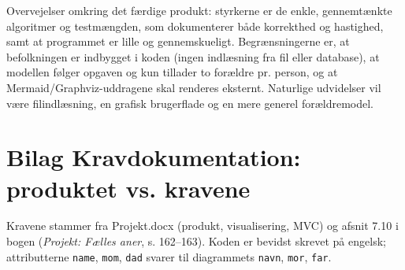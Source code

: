 \documentclass[12pt, a4paper]{article}
\begin{document}
Overvejelser omkring det færdige produkt: styrkerne er de enkle,
gennemtænkte algoritmer og testmængden, som dokumenterer både korrekthed og
hastighed, samt at programmet er lille og gennemskueligt. Begrænsningerne er, at
befolkningen er indbygget i koden (ingen indlæsning fra fil eller database),
at modellen følger opgaven og kun tillader to forældre pr. person, og at
Mermaid/Graphviz-uddragene skal renderes eksternt. Naturlige udvidelser vil
være filindlæsning, en grafisk brugerflade og en mere generel forældremodel.

\appendix
\section{Bilag Kravdokumentation: produktet vs. kravene}

Kravene stammer fra Projekt.docx (produkt, visualisering, MVC) og afsnit 7.10 i
bogen (\emph{Projekt: Fælles aner}, s. 162--163). Koden er bevidst skrevet på
engelsk; attributterne \texttt{name}, \texttt{mom}, \texttt{dad} svarer til
diagrammets \texttt{navn}, \texttt{mor}, \texttt{far}.
\end{document}
